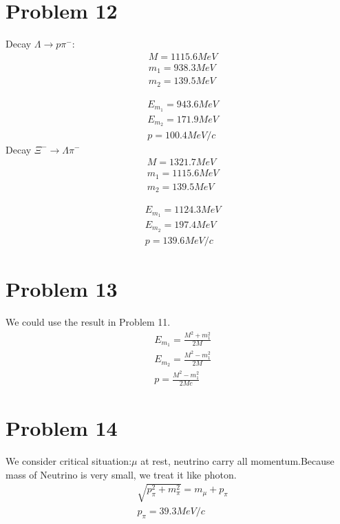 \documentclass{article}
\begin{document}
\begin{CJK*}{GBK}{song}
\section{Problem 12}
Decay $\Lambda\rightarrow p\pi^-$:
\begin{equation} 
\begin{aligned}
&M=1115.6MeV\\
&m_1=938.3MeV\\
&m_2=139.5MeV
\end{aligned}
\end{equation}

\begin{equation} 
\begin{aligned}
&E_{m_1}=943.6MeV\\
&E_{m_2}=171.9MeV\\
&p=100.4MeV/c
\end{aligned}
\end{equation}
Decay $\Xi^-\rightarrow\Lambda\pi^-$
\begin{equation} 
\begin{aligned}
&M=1321.7MeV\\
&m_1=1115.6MeV\\
&m_2=139.5MeV
\end{aligned}
\end{equation}

\begin{equation} 
\begin{aligned}
&E_{m_1}=1124.3MeV\\
&E_{m_2}=197.4MeV\\
&p=139.6MeV/c
\end{aligned}
\end{equation}

\section{Problem 13}
We could use the result in Problem 11.
\begin{equation} 
\begin{aligned}
&E_{m_1}=\frac{M^2+m_1^2}{2M}\\
&E_{m_2}=\frac{M^2-m_1^2}{2M}\\
&p=\frac{M^2-m_1^2}{2Mc}
\end{aligned}
\end{equation}

\section{Problem 14}
We consider critical situation:$\mu$ at rest, neutrino carry all momentum.Because mass of Neutrino is very small, we treat it like photon.
\begin{equation} 
\begin{aligned}
&\sqrt{p_{\pi}^2+m_{\pi}^2}=m_{\mu}+p_{\pi}\\
&p_{\pi}=39.3MeV/c
\end{aligned}
\end{equation}

\end{CJK*}
\end{document}
